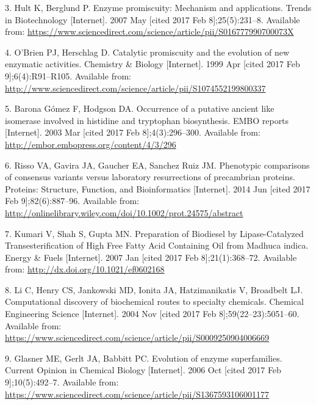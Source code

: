 \documentclass[12pt,twoside]{reedthesis}
\begin{document}
  \hypertarget{ref-hult_enzyme_2007}{}
  3. Hult K, Berglund P. Enzyme promiscuity: Mechanism and applications.
  Trends in Biotechnology {[}Internet{]}. 2007 May {[}cited 2017 Feb
  8{]};25(5):231--8. Available from:
  \url{https://www.sciencedirect.com/science/article/pii/S016777990700073X}
  
  \hypertarget{ref-obrien_catalytic_1999}{}
  4. O'Brien PJ, Herschlag D. Catalytic promiscuity and the evolution of
  new enzymatic activities. Chemistry \& Biology {[}Internet{]}. 1999 Apr
  {[}cited 2017 Feb 9{]};6(4):R91--R105. Available from:
  \url{http://www.sciencedirect.com/science/article/pii/S1074552199800337}
  
  \hypertarget{ref-baronagomez_occurrence_2003}{}
  5. Barona Gómez F, Hodgson DA. Occurrence of a putative ancient like
  isomerase involved in histidine and tryptophan biosynthesis. EMBO
  reports {[}Internet{]}. 2003 Mar {[}cited 2017 Feb 8{]};4(3):296--300.
  Available from: \url{http://embor.embopress.org/content/4/3/296}
  
  \hypertarget{ref-risso_phenotypic_2014}{}
  6. Risso VA, Gavira JA, Gaucher EA, Sanchez Ruiz JM. Phenotypic
  comparisons of consensus variants versus laboratory resurrections of
  precambrian proteins. Proteins: Structure, Function, and Bioinformatics
  {[}Internet{]}. 2014 Jun {[}cited 2017 Feb 9{]};82(6):887--96. Available
  from:
  \url{http://onlinelibrary.wiley.com/doi/10.1002/prot.24575/abstract}
  
  \hypertarget{ref-kumari_preparation_2007}{}
  7. Kumari V, Shah S, Gupta MN. Preparation of Biodiesel by
  Lipase-Catalyzed Transesterification of High Free Fatty Acid Containing
  Oil from Madhuca indica. Energy \& Fuels {[}Internet{]}. 2007 Jan
  {[}cited 2017 Feb 8{]};21(1):368--72. Available from:
  \url{http://dx.doi.org/10.1021/ef0602168}
  
  \hypertarget{ref-li_computational_2004}{}
  8. Li C, Henry CS, Jankowski MD, Ionita JA, Hatzimanikatis V, Broadbelt
  LJ. Computational discovery of biochemical routes to specialty
  chemicals. Chemical Engineering Science {[}Internet{]}. 2004 Nov
  {[}cited 2017 Feb 8{]};59(22--23):5051--60. Available from:
  \url{https://www.sciencedirect.com/science/article/pii/S0009250904006669}
  
  \hypertarget{ref-glasner_evolution_2006}{}
  9. Glasner ME, Gerlt JA, Babbitt PC. Evolution of enzyme superfamilies.
  Current Opinion in Chemical Biology {[}Internet{]}. 2006 Oct {[}cited
  2017 Feb 9{]};10(5):492--7. Available from:
  \url{https://www.sciencedirect.com/science/article/pii/S1367593106001177}
  
\end{document}
